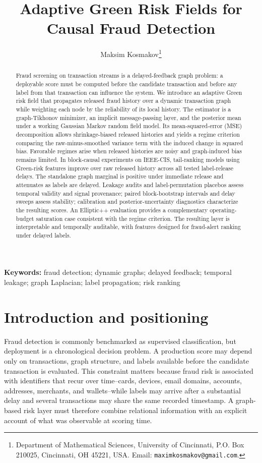 \documentclass[11pt]{article}
\title{Adaptive Green Risk Fields for Causal Fraud Detection}
\author{Maksim Kosmakov\thanks{Department of Mathematical Sciences, University of Cincinnati,
P.O. Box 210025, Cincinnati, OH 45221, USA. Email: \texttt{maximkosmakov@gmail.com}.}}
\date{}
\theoremstyle{definition}
\theoremstyle{remark}
\begin{document}
\maketitle

\begin{abstract}
Fraud screening on transaction streams is a delayed-feedback graph problem: a deployable score must be computed before the candidate transaction and before any label from that transaction can influence the system. We introduce an adaptive Green risk field that propagates released fraud history over a dynamic transaction graph while weighting each node by the reliability of its local history. The estimator is a graph-Tikhonov minimizer, an implicit message-passing layer, and the posterior mean under a working Gaussian Markov random field model. Its mean-squared-error (MSE) decomposition allows shrinkage-biased released histories and yields a regime criterion comparing the raw-minus-smoothed variance term with the induced change in squared bias. Favorable regimes arise when released histories are noisy and graph-induced bias remains limited. In block-causal experiments on IEEE-CIS, tail-ranking models using Green-risk features improve over raw released history across all tested label-release delays. The standalone graph marginal is positive under immediate release and attenuates as labels are delayed. Leakage audits and label-permutation placebos assess temporal validity and signal provenance; paired block-bootstrap intervals and delay sweeps assess stability; calibration and posterior-uncertainty diagnostics characterize the resulting scores. An Elliptic++ evaluation provides a complementary operating-budget saturation case consistent with the regime criterion. The resulting layer is interpretable and temporally auditable, with features designed for fraud-alert ranking under delayed labels.
\end{abstract}

\noindent\textbf{Keywords:} fraud detection; dynamic graphs; delayed feedback; temporal leakage; graph Laplacian; label propagation; risk ranking

\vspace{0.75em}

\section{Introduction and positioning}

Fraud detection is commonly benchmarked as supervised classification, but deployment is a chronological decision problem. A production score may depend only on transactions, graph structure, and labels available before the candidate transaction is evaluated. This constraint matters because fraud risk is associated with identifiers that recur over time--cards, devices, email domains, accounts, addresses, merchants, and wallets--while labels may arrive after a substantial delay and several transactions may share the same recorded timestamp. A graph-based risk layer must therefore combine relational information with an explicit account of what was observable at scoring time.
\end{document}
